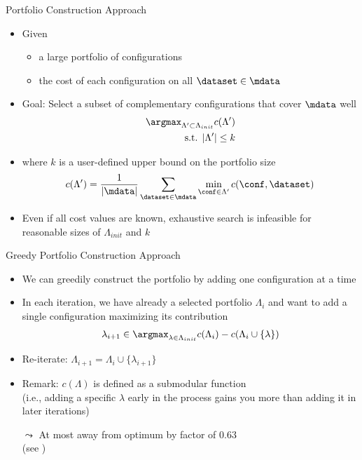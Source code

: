 \begin{frame}[c]{Portfolio Construction Approach}

\begin{itemize}
	\item Given
	\begin{itemize}
		\item a large portfolio of configurations
		\item the cost of each configuration on all $\dataset \in \mdata$ 
	\end{itemize} 
	\pause
	\item Goal: Select a subset of complementary configurations that cover $\mdata$ well
	\begin{eqnarray}
	\argmax_{\Lambda' \subset \Lambda_{init}} c(\Lambda')\nonumber\\
	\text{s.t. } |\Lambda'| \leq k \nonumber 
	\end{eqnarray}
	\item where $k$ is a user-defined upper bound on the portfolio size
	\pause
$$		c(\Lambda') = \frac{1}{|\mdata|} \sum_{\dataset \in \mdata} \min_{\conf \in \Lambda'} c(\conf, \dataset) $$
	\pause
	\medskip
	\item Even if all cost values are known, exhaustive search is infeasible for reasonable sizes of $\Lambda_{init}$ and $k$
\end{itemize}


\end{frame}
\begin{frame}[c]{Greedy Portfolio Construction Approach}

\begin{itemize}
	\item We can greedily construct the portfolio by adding one configuration at a time
	\pause
	\item In each iteration, we have already a selected portfolio $\Lambda_i$ and want to add a single configuration maximizing its contribution
	\begin{eqnarray}
	\lambda_{i+1} \in \argmax_{\lambda \in \Lambda_{init}} c(\Lambda_i) - c(\Lambda_i \cup \{\lambda\})
	\end{eqnarray}
	\item Re-iterate: $\Lambda_{i+1} = \Lambda_i \cup \{\lambda_{i+1}\}$
	\pause
	\medskip
	\item \alert{Remark}: $c(\Lambda)$ is defined as a \alert{submodular} function\\
	(i.e., adding a specific $\lambda$ early in the process gains you more than adding it in later iterations)
	\item[$\leadsto$] At most away from optimum by factor of $0.63$\\ (see )
\end{itemize}


\end{frame}
